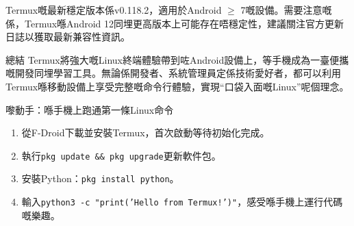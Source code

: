 
Termux嘅最新穩定版本係v0.118.2，適用於Android $\geq$ 7嘅設備。需要注意嘅係，Termux喺Android 12同埋更高版本上可能存在唔穩定性，建議關注官方更新日誌以獲取最新兼容性資訊。

\begin{tcbinfo}{總結}
Termux將強大嘅Linux終端體驗帶到咗Android設備上，等手機成為一臺便攜嘅開發同埋學習工具。無論係開發者、系統管理員定係技術愛好者，都可以利用Termux喺移動設備上享受完整嘅命令行體驗，實現“口袋入面嘅Linux”呢個理念。

\end{tcbinfo}

\begin{tcbpractice}{嚟動手：喺手機上跑通第一條Linux命令}
\begin{enumerate}
  \item 從F-Droid下載並安裝Termux，首次啟動等待初始化完成。
  \item 執行\texttt{pkg update \&\& pkg upgrade}更新軟件包。
  \item 安裝Python：\texttt{pkg install python}。
  \item 輸入\texttt{python3 -\allowbreak c "print('Hello from Termux!')"}，感受喺手機上運行代碼嘅樂趣。
\end{enumerate}

\end{tcbpractice}
